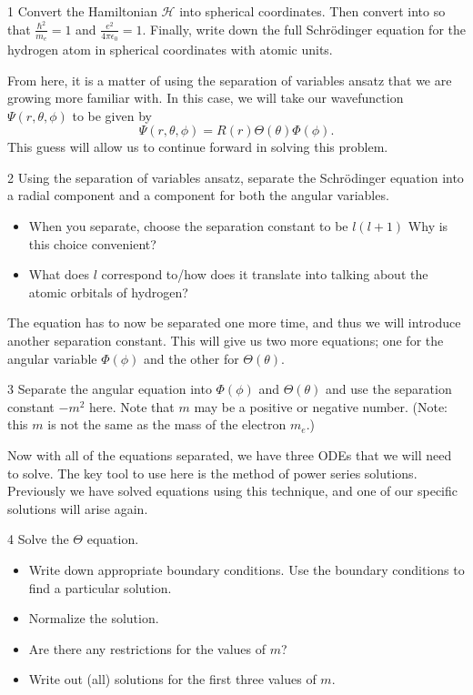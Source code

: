 \documentclass{article}
\newcommand{\hamiltonian}{\mathcal{H}}
\begin{document}
\begin{problem}{}{1}
Convert the Hamiltonian $\hamiltonian$ into spherical coordinates.  Then convert into  so that $\frac{\hbar^2}{m_e}=1$ and $\frac{e^2}{4\pi \epsilon_0}=1$.  Finally, write down the full Schr\"odinger equation for the hydrogen atom in spherical coordinates with atomic units.
\end{problem}
\noindent From here, it is a matter of using the separation of variables ansatz that we are growing more familiar with.  In this case, we will take our wavefunction $\Psi(r,\theta,\phi)$ to be given by
\[
\Psi(r,\theta,\phi) = R(r) \Theta(\theta) \Phi(\phi).
\]
This guess will allow us to continue forward in solving this problem.
\begin{problem}{}{2}
Using the separation of variables ansatz, separate the Schr\"odinger equation into a radial component and a component for both the angular variables.
\begin{itemize}
    \item When you separate, choose the separation constant to be $l(l+1)$ Why is this choice convenient?
    \item What does $l$ correspond to/how does it translate into talking about the atomic orbitals of hydrogen?
\end{itemize}
\end{problem}
\noindent The equation has to now be separated one more time, and thus we will introduce another separation constant.  This will give us two more equations; one for the angular variable $\Phi(\phi)$ and the other for $\Theta(\theta)$.

\begin{problem}{}{3}
Separate the angular equation into $\Phi(\phi)$ and $\Theta(\theta)$ and use the separation constant $-m^2$ here.  Note that $m$ may be a positive or negative number.  (Note: this $m$ is not the same as the mass of the electron $m_e$.)
\end{problem}

\noindent Now with all of the equations separated, we have three ODEs that we will need to solve. The key tool to use here is the method of power series solutions.  Previously we have solved equations using this technique, and one of our specific solutions will arise again.

\begin{problem}{}{4}
Solve the $\Theta$ equation.
\begin{itemize}
    \item Write down appropriate boundary conditions. Use the boundary conditions to find a particular solution.
    \item Normalize the solution.
    \item Are there any restrictions for the values of $m$?
    \item Write out (all) solutions for the first three values of $m$.
\end{itemize}
\end{problem}
\end{document}
